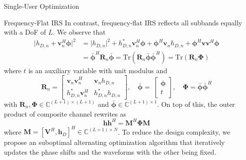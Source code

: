 \documentclass{IEEEtran}
\begin{document}
\begin{section}{Single-User Optimization}
	\begin{subsection}{Frequency-Flat IRS}
		In contrast, frequency-flat IRS reflects all subbands equally with a DoF of $L$. We observe that
		\begin{equation}
			\begin{split}
				\lvert{h_{D,n}+\boldsymbol{v}_n^H\boldsymbol{\phi}}\rvert^2
				&=\lvert{h_{D,n}}\rvert^2+h_{D,n}^*\boldsymbol{v}_n^H\boldsymbol{\phi}+\boldsymbol{\phi}^H\boldsymbol{v}_n{h_{D,n}}+\boldsymbol{\phi}^H\boldsymbol{v}\boldsymbol{v}^H\boldsymbol{\phi}\\
				&=\bar{\boldsymbol{\phi}}^H\boldsymbol{R}_n\bar{\boldsymbol{\phi}}=\mathrm{Tr}(\boldsymbol{R}_n\bar{\boldsymbol{\phi}}\bar{\boldsymbol{\phi}}^H)=\mathrm{Tr}(\boldsymbol{R}_n\boldsymbol{\Phi})
			\end{split}
		\end{equation}
		where $t$ is an auxiliary variable with unit modulus and
		\begin{equation}
			\boldsymbol{R}_n=
			\begin{bmatrix}
				\boldsymbol{v}_n\boldsymbol{v}_n^H & \boldsymbol{v}_n{h_{D,n}} \\
				h_{D,n}^*{\boldsymbol{v}_n^H}      & h_{D,n}^*{h_{D,n}}
			\end{bmatrix},
			\quad \bar{\boldsymbol{\phi}}=\
			\begin{bmatrix}
				\boldsymbol{\phi} \\
				t
			\end{bmatrix},
			\quad \boldsymbol{\Phi}=\bar{\boldsymbol{\phi}}\bar{\boldsymbol{\phi}}^H
		\end{equation}
		with $\boldsymbol{R}_n,\boldsymbol{\Phi} \in \mathbb{C}^{(L+1) \times (L+1)}$ and $\bar{\boldsymbol{\phi}} \in \mathbb{C}^{(L+1) \times 1}$. On top of this, the outer product of composite channel rewrites as
		\begin{equation}
			\boldsymbol{h}\boldsymbol{h}^H=\boldsymbol{M}^H\boldsymbol{\Phi}\boldsymbol{M}
		\end{equation}
		where $\boldsymbol{M}=[\boldsymbol{V}^H,\boldsymbol{h}_D]^H \in \mathbb{C}^{(L+1) \times N}$. To reduce the design complexity, we propose an suboptimal alternating optimization algorithm that iteratively updates the phase shifts and the waveforms with the other being fixed.


\end{subsection}
\end{section}
\end{document}
